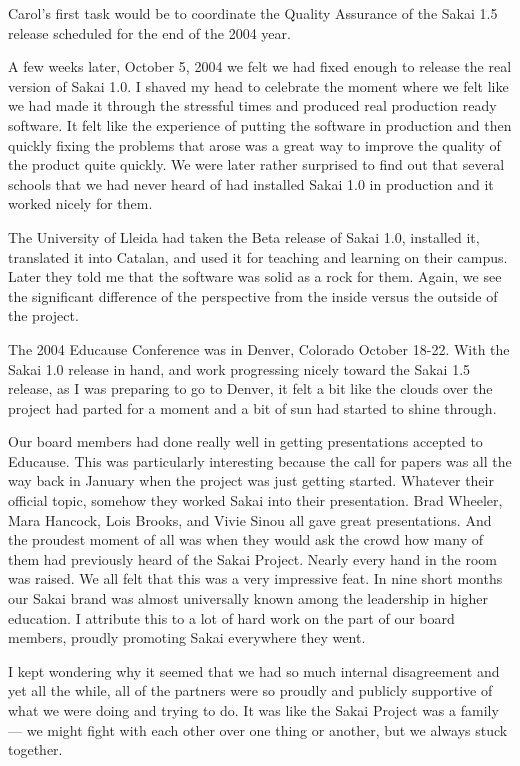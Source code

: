 \documentclass[12pt]{book}
\begin{document}
Carol's first task would be to coordinate
the Quality Assurance of the Sakai 1.5 release
scheduled for the end of the 2004 year.

A few weeks later, October 5, 2004 we felt we had fixed
enough to release the real version of Sakai 1.0.
I shaved my head to celebrate the moment where we felt like
we had made it through the stressful times and produced
real production ready software.  It felt like the experience
of putting the software in production and then quickly
fixing the problems that arose was a great way to improve
the quality of the product quite quickly.
We were later rather surprised to find
out that several schools that we had never heard
of had installed Sakai 1.0 in production and
it worked nicely for them.


The University of Lleida had taken the
Beta release of Sakai 1.0, installed it, translated it
into Catalan, and used it for teaching and
learning on their campus.  Later they told
me that the software was solid as a rock for them.
Again, we see the significant difference of the perspective
from the inside versus the outside of the
project.

The 2004 Educause Conference was in Denver, Colorado
October 18-22.  With the Sakai 1.0 release in hand,
and work progressing nicely toward the Sakai 1.5
release, as I was preparing to go to Denver,
it felt a bit like the clouds over the project
had parted for a moment and a bit of sun had
started to shine through.

Our board members had done really well in getting
presentations accepted to Educause.  This was particularly
interesting because the call for papers was all
the way back in January when the project was just
getting started.  Whatever their official topic,
somehow they worked Sakai into their presentation.
Brad Wheeler, Mara Hancock, Lois Brooks, and Vivie Sinou
all gave great presentations.  And the proudest moment of all
was when they would ask the crowd how many of them
had previously heard of the Sakai Project.
Nearly every hand in the room was raised.
We all felt that this was a very impressive feat.
In nine short months our Sakai brand was almost universally
known among the leadership in higher education.
I attribute this to a lot of hard work on the part
of our board members, proudly promoting Sakai
everywhere they went.

I kept wondering why it seemed that we had
so much internal disagreement and yet all the
while, all of the partners were so proudly and
publicly supportive of what we were doing and
trying to do.  It was like the Sakai Project was
a family --- we might fight with each other over one thing
or another, but we always stuck together.
\end{document}
